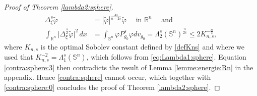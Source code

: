 \documentclass[10pt]{amsart}
\numberwithin{equation}{section}
\newcommand{\R}{\mathbb{R}}
\def\La{{\Lambda}}
\def\la{{\lambda}}
\gdef\mS{\doba{S}}
\newcommand{\vp}{\varphi}
\theoremstyle{plain}
\theoremstyle{remark}
\begin{document}
\begin{proof}[Proof of Theorem \ref{lambda2:sphere}]
\begin{equation}
\begin{aligned}
\Delta_\xi^s \tilde{\vp} & = |\tilde \vp|^{\frac{4s}{n-2s}}  \tilde{\vp} \quad \text{ in } \R^n \quad \text{ and }\\
\int_{\R^n} \big|\Delta_\xi^{\frac{s}{2}} \tilde{\vp} \big|^{2} \, dx & = \int_{\mathbb{S}^n} \vp P_{g_0}^s \vp dv_{g_0} =   \Lambda_2^s(\mathbb{S}^n) ^{\frac{n}{2s}} \le 2 K_{n,s}^{-\frac{n}{s}},
\end{aligned}
\end{equation}
where $K_{n,s}$ is the optimal Sobolev constant defined by \eqref{defKns} and where we used that $K_{n,s}^{-2} = \Lambda_1^s(\mathbb{S}^n)$, which follows from \eqref{eq:Lambda1:sphere}. Equation \eqref{contra:sphere:3} then contradicts the result of Lemma \ref{lemme:energie:Rn} in the appendix. Hence \eqref{contra:sphere} cannot occur, which together with \eqref{contra:sphere:0} concludes the proof of Theorem \ref{lambda2:sphere}.
\end{proof}






\end{document}
